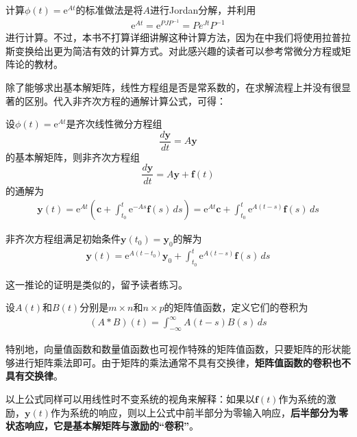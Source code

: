 计算$\phi(t)=\mathrm{e}^{At}$的标准做法是将$A$进行Jordan分解，并利用\begin{align*}
    \mathrm{e}^{At}=\mathrm{e}^{PJP^{-1}}=Pe^{Jt}P^{-1}
\end{align*}
进行计算。不过，本书不打算详细讲解这种计算方法，因为在中我们将使用拉普拉斯变换给出更为简洁有效的计算方式。对此感兴趣的读者可以参考常微分方程\cite{ode}或矩阵论的教材。

除了能够求出基本解矩阵，线性方程组是否是常系数的，在求解流程上并没有很显著的区别。代入非齐次方程的通解计算公式，可得：
\begin{theorem}
    设$\phi(t)=\mathrm{e}^{At}$是齐次线性微分方程组
    $$\frac{d\mathbf{y}}{dt}=A\mathbf{y}$$
    的基本解矩阵，则非齐次方程组
    $$\frac{d\mathbf{y}}{dt}=A\mathbf{y}+\mathbf{f}(t)$$
    的通解为\begin{align*}
    \mathbf{y}(t)=\mathrm{e}^{At}\left(\mathbf{c}+\int_{t_0}^t \mathrm{e}^{-As}\mathbf{f}(s)\,ds\right)=\mathrm{e}^{At}\mathbf{c}+\int_{t_0}^t \mathrm{e}^{A(t-s)}\mathbf{f}(s)\,ds
    \end{align*}
\end{theorem}

\begin{corollary}\label{cor:differential_equation_system}
    非齐次方程组满足初始条件$\mathbf{y}(t_0)=\mathbf{y}_0$的解为\begin{align*}
    \mathbf{y}(t)=\mathrm{e}^{A(t-t_0)}\mathbf{y}_0+\int_{t_0}^t \mathrm{e}^{A(t-s)}\mathbf{f}(s)\,ds
    \end{align*}
\end{corollary}

这一推论的证明是类似的，留予读者练习。

\begin{definition}[矩阵值函数的卷积]
    设$A(t)$和$B(t)$分别是$m\times n$和$n\times p$的矩阵值函数，定义它们的卷积为\begin{align*}
    (A*B)(t)=\int_{-\infty}^{\infty} A(t-s)B(s)\,ds
    \end{align*}
\end{definition}

特别地，向量值函数和数量值函数也可视作特殊的矩阵值函数，只要矩阵的形状能够进行矩阵乘法即可。由于矩阵的乘法通常不具有交换律，\textbf{矩阵值函数的卷积也不具有交换律}。

以上公式同样可以用线性时不变系统的视角来解释：如果以$\mathbf{f}(t)$作为系统的激励，$\mathbf{y}(t)$作为系统的响应，则以上公式中前半部分为零输入响应，\textbf{后半部分为零状态响应，它是基本解矩阵与激励的“卷积”}。

